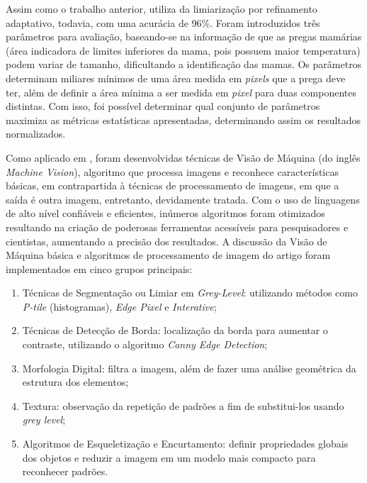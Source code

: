 Assim como o trabalho anterior,  utiliza da limiarização por refinamento adaptativo, todavia, com uma acurácia de 96\%. Foram introduzidos três parâmetros para avaliação, baseando-se na informação de que as pregas mamárias (área indicadora de limites inferiores da mama, pois possuem maior temperatura) podem variar de tamanho, dificultando a identificação das mamas. Os parâmetros determinam miliares mínimos de uma área medida em \textit{pixels} que a prega deve ter, além de definir a área mínima a ser medida em \textit{pixel} para duas componentes distintas. Com isso, foi possível determinar qual conjunto de parâmetros maximiza as métricas estatísticas apresentadas, determinando assim os resultados normalizados.

Como aplicado em , foram desenvolvidas técnicas de Visão de Máquina (do inglês \textit{Machine Vision}), algoritmo que processa imagens e reconhece características básicas, em contrapartida à técnicas de processamento de imagens, em que a saída é outra imagem, entretanto, devidamente tratada. Com o uso de linguagens de alto nível confiáveis e eficientes, inúmeros algoritmos foram otimizados resultando na criação de poderosas ferramentas acessíveis para pesquisadores e cientistas, aumentando a precisão dos resultados. A discussão da Visão de Máquina básica e algoritmos de processamento de imagem do artigo foram implementados em cinco grupos principais: 
\begin{enumerate}
  \renewcommand{\labelenumi}{\alph{enumi})}
    \item Técnicas de Segmentação ou Limiar em \textit{Grey-Level}: utilizando métodos como \textit{P-tile} (histogramas), \textit{Edge Pixel} e \textit{Interative};
    
    \item Técnicas de Detecção de Borda: localização da borda para aumentar o contraste, utilizando o algoritmo \textit{Canny Edge Detection};
    
    \item Morfologia Digital: filtra a imagem, além de fazer uma análise geométrica da estrutura dos elementos;
    
    \item Textura: observação da repetição de padrões a fim de substitui-los usando \textit{grey level};
    
    \item Algoritmos de Esqueletização e Encurtamento: definir propriedades globais dos objetos e reduzir a imagem em um modelo mais compacto para reconhecer padrões.
\end{enumerate}



